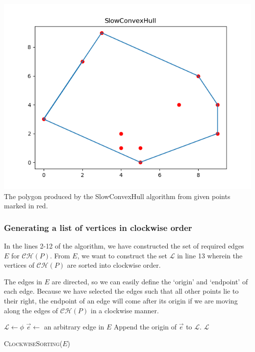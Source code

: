 \documentclass{article}
\begin{document}
\begin{center}
    \includegraphics[scale=0.54]{SlowConvexHull}\\
    \tiny{The polygon produced by the SlowConvexHull algorithm from given points marked in red.}
\end{center}

\subsubsection{Generating a list of vertices in clockwise order}

In the lines 2-12 of the algorithm, we have constructed the set of required edges $E$ for $\mathcal{CH}(P)$. From $E$, we want to construct the set $\mathcal{L}$ in line 13 wherein the vertices of $\mathcal{CH}(P)$ are sorted into clockwise order.

The edges in $E$ are directed, so we can easily define the `origin' and `endpoint' of each edge. Because we have selected the edges such that all other points lie to their right, the endpoint of an edge will come after its origin if we are moving along the edges of $\mathcal{CH}(P)$ in a clockwise manner.

\begin{algorithm}[H]
\DontPrintSemicolon 
{}
$\mathcal{L} \leftarrow \phi $\;
$\overrightarrow{e} \leftarrow$ an arbitrary edge in $E$\;
Append the origin of $\overrightarrow{e}$ to $\mathcal{L}$.\;
\Return $\mathcal{L}$\;
\caption{\textsc{ClockwiseSorting}($E$)}
\end{algorithm}
\end{document}

